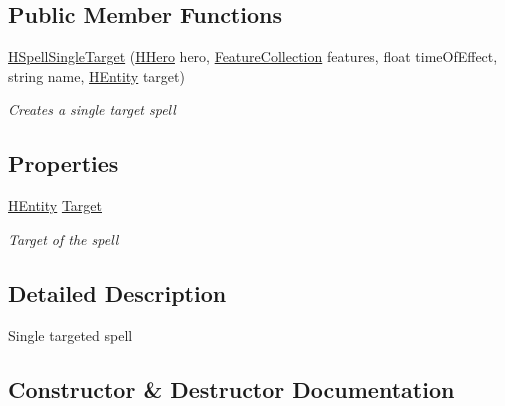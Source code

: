 \subsection*{Public Member Functions}
\begin{DoxyCompactItemize}
\item 
\hyperlink{class_hel_project_1_1_game_world_1_1_spells_1_1_h_spell_single_target_ac17216b17a63c040afc7dae6a14f420a}{H\+Spell\+Single\+Target} (\hyperlink{class_hel_project_1_1_game_world_1_1_entities_1_1_h_hero}{H\+Hero} hero, \hyperlink{class_hel_project_1_1_features_1_1_feature_collection}{Feature\+Collection} features, float time\+Of\+Effect, string name, \hyperlink{class_hel_project_1_1_game_world_1_1_entities_1_1_h_entity}{H\+Entity} target)
\begin{DoxyCompactList}\small\item\em Creates a single target spell \end{DoxyCompactList}\end{DoxyCompactItemize}
\subsection*{Properties}
\begin{DoxyCompactItemize}
\item 
\hyperlink{class_hel_project_1_1_game_world_1_1_entities_1_1_h_entity}{H\+Entity} \hyperlink{class_hel_project_1_1_game_world_1_1_spells_1_1_h_spell_single_target_addb117babce01c6786178be3d38c3222}{Target}
\begin{DoxyCompactList}\small\item\em Target of the spell \end{DoxyCompactList}\end{DoxyCompactItemize}


\subsection{Detailed Description}
Single targeted spell 



\subsection{Constructor \& Destructor Documentation}
\hypertarget{class_hel_project_1_1_game_world_1_1_spells_1_1_h_spell_single_target_ac17216b17a63c040afc7dae6a14f420a}{}

